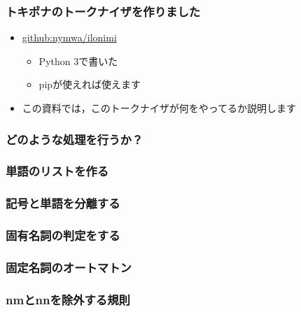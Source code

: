 \documentclass[14pt]{beamer}
\begin{document}
\begin{frame}
	\frametitle{トキポナのトークナイザを作りました}

	\begin{itemize}
		\item \href{https://github.com/nymwa/ilonimi}{github:nymwa/ilonimi}
			\begin{itemize}
				\item Python 3で書いた
				\item pipが使えれば使えます
			\end{itemize}
		\item この資料では，このトークナイザが何をやってるか説明します
	\end{itemize}
\end{frame}

\begin{frame}
	\frametitle{どのような処理を行うか？}
\end{frame}

\begin{frame}
	\frametitle{単語のリストを作る}
\end{frame}

\begin{frame}
	\frametitle{記号と単語を分離する}
\end{frame}

\begin{frame}
	\frametitle{固有名詞の判定をする}
\end{frame}

\begin{frame}
	\frametitle{固定名詞のオートマトン}
\end{frame}

\begin{frame}
	\frametitle{nmとnnを除外する規則}
\end{frame}
\end{document}
